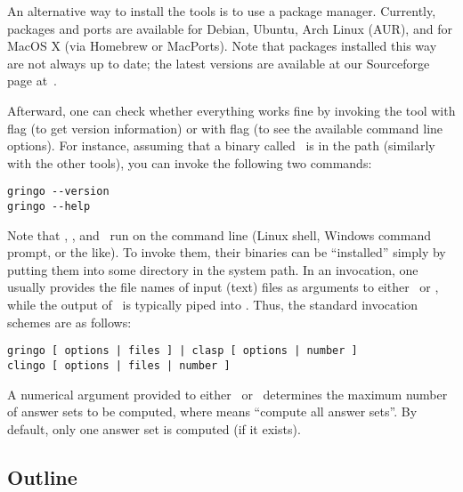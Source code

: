 An alternative way to install the tools is to use a package manager.
Currently, packages and ports are available for Debian, Ubuntu, Arch Linux (AUR), and for MacOS X (via Homebrew or MacPorts).
Note that packages installed this way are not always up to date;
the latest versions are available at our Sourceforge page at~\cite{potassco}.

Afterward,
one can check whether every\-thing works fine by invoking the tool
with flag  (to get version information) or
with flag  (to see the available command line options).
For instance, assuming that a binary called \gringo\ is in the path
(similarly with the other tools),
you can invoke the following two commands:
%
\begin{lstlisting}[numbers=none]
gringo --version
gringo --help
\end{lstlisting}

Note that \gringo, \clasp, and \clingo\ 
run on the command line (Linux shell, Windows command prompt, or the like).
To invoke them, their binaries can be ``installed''
simply by putting them into some directory in the system path.
In an invocation,
one usually provides the file names of input (text) files 
as arguments to either \gringo\ or \clingo,
while the output of \gringo\ is typically piped into \clasp.
Thus, the standard invocation schemes are as follows:
\begin{lstlisting}[numbers=none]
gringo [ options | files ] | clasp [ options | number ]
clingo [ options | files | number ]
\end{lstlisting}
A numerical argument provided to either \clasp\ or \clingo\
determines the maximum number of answer sets to be computed,
where \code{0} means ``compute all answer sets''.
By default, only one answer set is computed (if it exists).

\subsection{Outline}\label{sec:outline}

